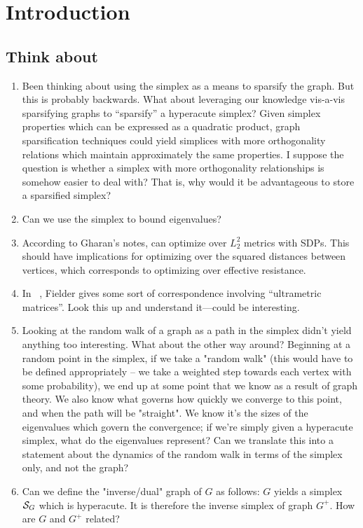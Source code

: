 \chapter{Introduction}


\section{Think about}
\begin{enumerate}		
	\item Been thinking about using the simplex as a means to sparsify the graph. But this is probably backwards. What about leveraging our knowledge vis-a-vis sparsifying graphs to ``sparsify'' a hyperacute simplex? Given simplex properties which can be expressed as a quadratic product, graph sparsification  techniques could  yield simplices with more orthogonality relations which maintain approximately the same properties. I suppose the question is whether a simplex with more orthogonality relationships is somehow easier to deal with? That is, why would it be advantageous to store a sparsified simplex?
	\item Can we use the simplex to bound eigenvalues?
	\item According to Gharan's notes, can optimize over $L_2^2$ metrics with SDPs. This should have implications for optimizing over the squared distances between vertices, which corresponds to optimizing over effective resistance. 
	\item In ~\cite{fiedler1998some}, Fielder gives some sort of correspondence involving ``ultrametric matrices''. Look this up and understand it---could be interesting. 
	\item Looking at the random walk of a graph as a path in the simplex didn't yield anything too interesting. What about the other way around? Beginning at a random point in the simplex, if we take a "random walk" (this would have to be defined appropriately -- we take a weighted step towards each vertex with some probability), we end up at some point that we know as a result of graph theory. We also know what governs how quickly we converge to this point, and when the path will be "straight". We know it's the sizes of the eigenvalues which govern the convergence; if we're simply given a hyperacute simplex, what do the eigenvalues represent? Can we translate this into a statement about the dynamics of the random walk in terms of the simplex only, and not the graph?
	\item Can we define the "inverse/dual" graph of $G$ as follows: $G$ yields a simplex $\mathcal{S}_G$ which is hyperacute. It is therefore the inverse simplex of  graph $G^+$. How are $G$ and $G^+$ related? 

\end{enumerate}
